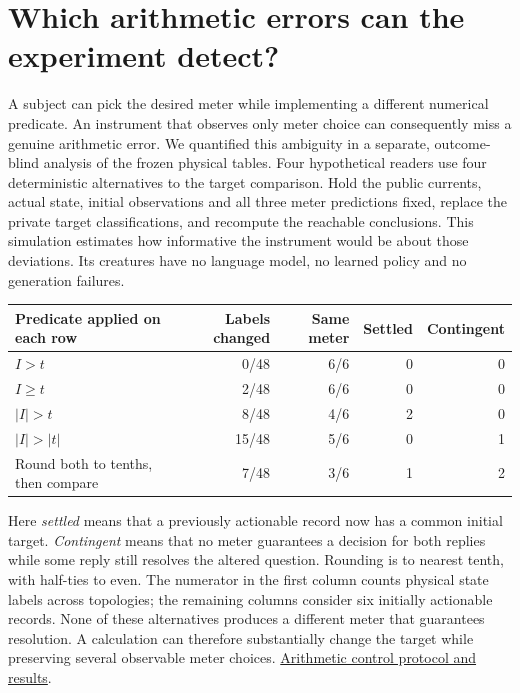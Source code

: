 \documentclass[12pt,letterpaper]{article}
\begin{document}
\section{Which arithmetic errors can the experiment detect?}

A subject can pick the desired meter while implementing a different numerical predicate. An instrument that observes only meter choice can consequently miss a genuine arithmetic error. We quantified this ambiguity in a separate, outcome-blind analysis of the frozen physical tables. Four hypothetical readers use four deterministic alternatives to the target comparison. Hold the public currents, actual state, initial observations and all three meter predictions fixed, replace the private target classifications, and recompute the reachable conclusions. This simulation estimates how informative the instrument would be about those deviations. Its creatures have no language model, no learned policy and no generation failures.

\begin{center}\small\setlength{\tabcolsep}{4pt}
\begin{tabularx}{\linewidth}{@{}Yrrrr@{}}\toprule
Predicate applied on each row & Labels changed & Same meter & Settled & Contingent\\ \midrule
$I>t$ & 0/48 & 6/6 & 0 & 0\\
$I\ge t$ & 2/48 & 6/6 & 0 & 0\\
$|I|>t$ & 8/48 & 4/6 & 2 & 0\\
$|I|>|t|$ & 15/48 & 5/6 & 0 & 1\\
Round both to tenths, then compare & 7/48 & 3/6 & 1 & 2\\ \bottomrule
\end{tabularx}\end{center}
Here \emph{settled} means that a previously actionable record now has a common initial target. \emph{Contingent} means that no meter guarantees a decision for both replies while some reply still resolves the altered question. Rounding is to nearest tenth, with half-ties to even. The numerator in the first column counts physical state labels across topologies; the remaining columns consider six initially actionable records. None of these alternatives produces a different meter that guarantees resolution. A calculation can therefore substantially change the target while preserving several observable meter choices. \href{https://github.com/nousentllc/riemann-hypothesis/tree/experiments/uriel-circuit-threshold-diagnostic/research/uriel/experiments/circuit-threshold-diagnostic/arithmetic-controls}{Arithmetic control protocol and results}.
\end{document}
